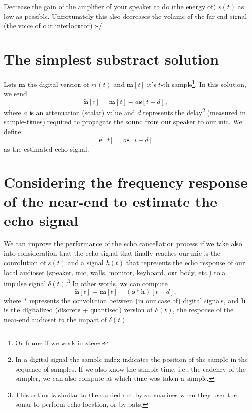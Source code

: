 Decrease the gain of the amplifier of your speaker to do (the energy
of) $s(t)$ as low as possible. Unfortunately this also decreases the
volume of the far-end signal (the voice of our interlocutor) :-/

\section{The simplest substract solution}
Lets ${\mathbf m}$ the digital version of $m(t)$ and ${\mathbf m}[t]$
it's $t$-th sample\footnote{Or frame if we work in stereo}. In this
solution, we send
\begin{equation}
  \tilde{\mathbf n}[t] = {\mathbf m}[t] - a{\mathbf s}[t-d],
  \label{eq:simplest}
\end{equation}
where $a$ is an attenuation (scalar) value and $d$ represents the
delay\footnote{In a digital signal the sample index indicates the
  position of the sample in the sequence of samples. If we also know
  the sample-time, i.e., the cadency of the sampler, we can also
  compute at which time was taken a sample.} (measured in
sample-times) required to propagate the sound from our speaker to our
mic. We define
\begin{equation}
  \hat{\mathbf e}[t] = a{\mathbf s}[i-d]
\end{equation}
as the estimated echo signal.

\section{Considering the frequency response of the near-end to estimate the echo signal}
We can improve the performance of the echo cancellation process if we
take also into consideration that the echo signal that finally reaches
our mic is the
\href{https://en.wikipedia.org/wiki/Convolution}{convolution} of
$s(t)$ and a signal $h(t)$ that represents the echo response of our
local audioset (speaker, mic, walls, monitor, keyboard, our body,
etc.) to a impulse signal $\delta(t)$.\footnote{This action is similar
  to the carried out by submarines when they user the sonar to perform
  echo-location, or by bats.} In other words, we can compute
\begin{equation}
 \tilde{\mathbf n}[t] = {\mathbf m}[t] - ({\mathbf s}*{\mathbf h})[t-d],
  \label{eq:using_convolution}
\end{equation}
where $*$ represents the convolution between (in our case of) digital
signals, and ${\mathbf h}$ is the digitalized (discrete + quantized)
version of $h(t)$, the response of the near-end audioset to the impact
of $\delta(t)$.

